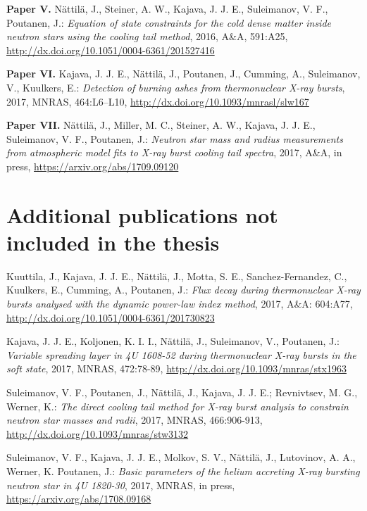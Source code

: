 \hspace{15pt}\textbf{Paper V.} Nättilä, J., Steiner, A. W., Kajava, J. J. E., Suleimanov, V. F., Poutanen, J.: 
\textit{Equation of state constraints for the cold dense matter inside neutron stars using the cooling tail method}, 
2016, A\&A, 591:A25, 
\url{http://dx.doi.org/10.1051/0004-6361/201527416}
 
\vspace{0.3cm}
\textbf{Paper VI.} Kajava, J. J. E., Nättilä, J., Poutanen, J., Cumming, A., Suleimanov, V., Kuulkers, E.: 
\textit{Detection of burning ashes from thermonuclear X-ray bursts}, 
2017, MNRAS, 464:L6–L10, 
\url{http://dx.doi.org/10.1093/mnrasl/slw167}

\vspace{0.3cm}
\textbf{Paper VII.} Nättilä, J., Miller, M. C., Steiner, A. W., Kajava, J. J. E., Suleimanov, V. F., Poutanen, J.: 
\textit{Neutron star mass and radius measurements from atmospheric model fits to X-ray burst cooling tail spectra}, 
2017, A\&A, in press, 
\url{https://arxiv.org/abs/1709.09120}




\newpage
\section*{Additional publications not included in the thesis}

\vspace{0.3cm}
\hspace{15pt} Kuuttila, J., Kajava, J. J. E., Nättilä, J., Motta, S. E., Sanchez-Fernandez, C., Kuulkers, E., Cumming, A., Poutanen, J.: 
\textit{Flux decay during thermonuclear X-ray bursts analysed with the dynamic power-law index method}, 
2017, A\&A: 604:A77, 
\url{http://dx.doi.org/10.1051/0004-6361/201730823}
 

\vspace{0.3cm}
 Kajava, J. J. E., Koljonen, K. I. I., Nättilä, J., Suleimanov, V., Poutanen, J.: 
\textit{Variable spreading layer in 4U 1608-52 during thermonuclear X-ray bursts in the soft state}, 2017, 
MNRAS, 472:78-89, 
\url{http://dx.doi.org/10.1093/mnras/stx1963}


\vspace{0.3cm}
 Suleimanov, V. F., Poutanen, J., Nättilä, J., Kajava, J. J. E.; Revnivtsev, M. G., Werner, K.: 
\textit{The direct cooling tail method for X-ray burst analysis to constrain neutron star masses and radii}, 
2017, MNRAS, 466:906-913, 
\url{http://dx.doi.org/10.1093/mnras/stw3132}
 

\vspace{0.3cm}
 Suleimanov, V. F., Kajava, J. J. E., Molkov, S. V., Nättilä, J., Lutovinov, A. A., Werner, K. Poutanen, J.: 
\textit{Basic parameters of the helium accreting X-ray bursting neutron star in 4U 1820-30}, 
2017, MNRAS, in press, 
\url{https://arxiv.org/abs/1708.09168}

